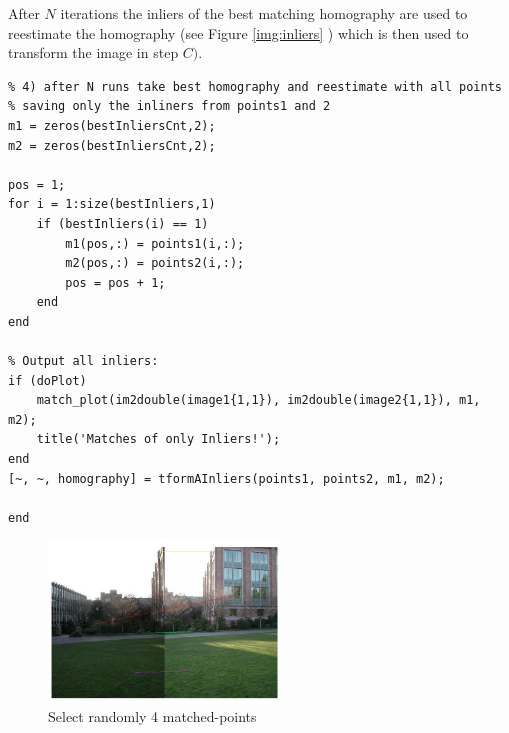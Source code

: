 \documentclass[subfigure,epsfig,fleqn,float,numbers=noenddot]{scrartcl}
\begin{document}
\hspace{5mm}

After $N$ iterations the inliers of the best matching homography are used to reestimate the homography (see Figure \ref{img:inliers} ) which is then used to transform the image in step $C)$. 

\hspace{0.5mm}

\begin{lstlisting}
% 4) after N runs take best homography and reestimate with all points
% saving only the inliners from points1 and 2
m1 = zeros(bestInliersCnt,2);
m2 = zeros(bestInliersCnt,2);

pos = 1;
for i = 1:size(bestInliers,1)
    if (bestInliers(i) == 1)
        m1(pos,:) = points1(i,:);
        m2(pos,:) = points2(i,:);
        pos = pos + 1;
    end
end

% Output all inliers:
if (doPlot)
    match_plot(im2double(image1{1,1}), im2double(image2{1,1}), m1, m2);
    title('Matches of only Inliers!');
end
[~, ~, homography] = tformAInliers(points1, points2, m1, m2);

end
\end{lstlisting}

	\begin{figure}[H]
		\centering
		\includegraphics[width=0.55\textwidth]{./img/fourRandomMatches.jpg}
		\caption{Select randomly 4 matched-points}
		\label{img:points}
	\end{figure}
\end{document}

